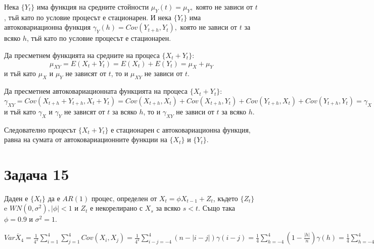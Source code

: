 \documentclass{article}
\begin{document}
\begin{flushleft}
\begin{flushleft}
\begin{flushleft}
Нека $\{Y_t \}$ има функция на средните стойности $\mu_Y(t) = \mu_Y,$ която не зависи от $t$, тъй като по условие процесът е стационарен. И нека $\{Y_t \}$ има автоковариационна функция $\gamma_Y(h) = Cov(Y_{t+h}, Y_{t}),$ която не зависи от $t$ за всяко $h$, тъй като по условие процесът е стационарен.
\end{flushleft}

\begin{flushleft}
Да пресметнем функцията на средните на процеса $\{X_t + Y_t \}$: \\
$$\mu_{XY} = E(X_t + Y_t) = E(X_t) + E(Y_t) = \mu_X + \mu_Y$$ и тъй като $\mu_X$ и $\mu_Y$ не зависят от $t$, то и $\mu_{XY}$ не зависи от $t$.
\end{flushleft}
\begin{flushleft}
Да пресметнем автоковариационната функцията на процеса $\{X_t + Y_t \}$: \\
$\gamma_{XY} = Cov(X_{t+h} + Y_{t+h}, X_t + Y_t) = Cov(X_{t+h}, X_{t}) + Cov(X_{t+h}, Y_t) + Cov(Y_{t+h}, X_t) + Cov(Y_{t+h}, Y_t) = \gamma_X + 0 + 0 + \gamma_Y = \gamma_X + \gamma_Y$ \\ 
и тъй като $\gamma_X$ и $\gamma_Y$ не зависят от $t$ за всяко $h$, то и $\gamma_{XY}$ не зависи от $t$ за всяко $h$. 
\end{flushleft}
Следователно процесът $\{X_t + Y_t \}$ е стационарен с автоковариационна функция, равна на сумата от автоковариационните функции на $\{X_t \}$ и $\{Y_t \}$.
\end{flushleft}

\section*{Задача 15}
\begin{flushleft}
Даден е $\{X_t \}$ да е $AR(1)$ процес, определен от $X_t = \phi X_{t-1} + Z_t$, където $\{Z_t \}$ e $WN(0, \sigma^2), |\phi| < 1$ и $Z_t$ е некорелирано с $X_s$ за всяко $s < t$. Също така $\phi = 0.9$ и $\sigma^2 = 1$. \\
\end{flushleft}
\begin{flushleft}
$Var \overline{X}_4 = \frac{1}{4^2} \sum_{i=1}^{4} \sum_{j=1}^{4} Cov(X_i, X_j) = \frac{1}{4^2} \sum_{i-j=-4}^{4} (n - |i - j|)\gamma(i-j) = \frac{1}{4} \sum_{h=-4}^{4} (1 - \frac{|h|}{n})\gamma(h) = \frac{1}{4} \sum_{h=-4}^{4} (1 - \frac{|h|}{4}) \frac{\phi^{|h|} \sigma^2}{1 - \phi^2}$
\end{flushleft}

\end{flushleft}
\end{document}
